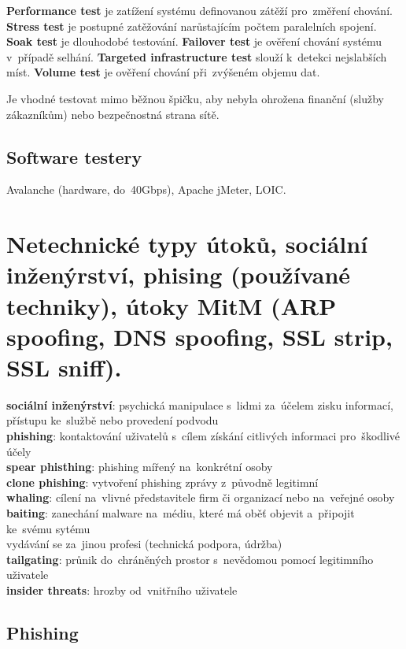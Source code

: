 \textbf{Performance test} je zatížení systému definovanou zátěží pro~změření chování. \textbf{Stress test} je postupné zatěžování narůstajícím počtem paralelních spojení. \textbf{Soak test} je dlouhodobé testování. \textbf{Failover test} je ověření chování systému v~případě selhání. \textbf{Targeted infrastructure test} slouží k~detekci nejslabších míst. \textbf{Volume test} je ověření chování při~zvýšeném objemu dat.

Je vhodné testovat mimo běžnou špičku, aby nebyla ohrožena finanční (služby zákazníkům) nebo bezpečnostná strana sítě.

\subsection{Software testery}

Avalanche (hardware, do~40Gbps), Apache jMeter, LOIC.

\clearpage
\section{Netechnické typy útoků, sociální inženýrství, phising (používané techniky), útoky MitM (ARP spoofing, DNS spoofing, SSL strip, SSL sniff).}

\textbf{sociální inženýrství}: psychická manipulace s~lidmi za~účelem zisku informací, přístupu ke~službě nebo provedení podvodu \\
\textbf{phishing}: kontaktování uživatelů s~cílem získání citlivých informaci pro~škodlivé účely \\
\textbf{spear phisthing}: phishing mířený na~konkrétní osoby \\
\textbf{clone phishing}: vytvoření phishing zprávy z~původně legitimní \\
\textbf{whaling}: cílení na~vlivné představitele firm či organizací nebo na~veřejné osoby \\
\textbf{baiting}: zanechání malware na~médiu, které má oběť objevit a~připojit ke~svému sytému \\
vydávání se za~jinou profesi (technická podpora, údržba) \\
\textbf{tailgating}: průnik do~chráněných prostor s~nevědomou pomocí legitimního uživatele \\
\textbf{insider threats}: hrozby od~vnitřního uživatele

\subsection*{Phishing}

